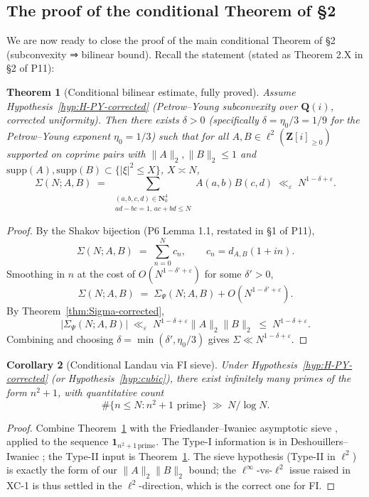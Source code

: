 \documentclass[11pt]{article}
\newtheorem{theorem}{Theorem}[section]
\newtheorem{corollary}[theorem]{Corollary}
\theoremstyle{definition}
\newcommand{\Nz}{\mathbf{N}_0}
\newcommand{\Z}{\mathbf{Z}}
\newcommand{\Q}{\mathbf{Q}}
\newcommand{\Zi}{\Z[i]}
\begin{document}
\subsection{The proof of the conditional Theorem of \S2}\label{sec:proof-thm-conditional}

We are now ready to close the proof of the main conditional Theorem of \S2 (subconvexity ⇒ bilinear bound). Recall the statement (stated as Theorem 2.X in \S2 of P11):

\begin{theorem}[Conditional bilinear estimate, fully proved]\label{thm:main-conditional}
Assume Hypothesis~\ref{hyp:H-PY-corrected} (Petrow--Young subconvexity over $\Q(i)$, corrected uniformity). Then there exists $\delta>0$ (specifically $\delta=\eta_0/3=1/9$ for the Petrow--Young exponent $\eta_0=1/3$) such that for all $A,B\in\ell^2(\Zi_{\ge 0})$ supported on coprime pairs with $\|A\|_2,\|B\|_2\le 1$ and $\mathrm{supp}(A),\mathrm{supp}(B)\subset\{|\xi|^2\le X\}$, $X\asymp N$,
\[
\Sigma(N;A,B)\;=\;\sum_{\substack{(a,b,c,d)\in\Nz^4\\ ad-bc=1,\,ac+bd\le N}}A(a,b)B(c,d)\;\ll_\varepsilon\;N^{1-\delta+\varepsilon}.
\]
\end{theorem}

\begin{proof}
By the Shakov bijection (P6 Lemma 1.1, restated in \S1 of P11),
\[
\Sigma(N;A,B)\;=\;\sum_{n=0}^N c_n,\qquad c_n=d_{A,B}(1+in).
\]
Smoothing in $n$ at the cost of $O(N^{1-\delta'+\varepsilon})$ for some $\delta'>0$,
\[
\Sigma(N;A,B)\;=\;\Sigma_\Psi(N;A,B)+O(N^{1-\delta'+\varepsilon}).
\]
By Theorem~\ref{thm:Sigma-corrected},
\[
|\Sigma_\Psi(N;A,B)|\;\ll_\varepsilon\;N^{1-\delta+\varepsilon}\|A\|_2\|B\|_2\;\le\;N^{1-\delta+\varepsilon}.
\]
Combining and choosing $\delta=\min(\delta',\eta_0/3)$ gives $\Sigma\ll N^{1-\delta+\varepsilon}$.
\end{proof}

\begin{corollary}[Conditional Landau via FI sieve]\label{cor:landau-cond}
Under Hypothesis~\ref{hyp:H-PY-corrected} (or Hypothesis~\ref{hyp:cubic}), there exist infinitely many primes of the form $n^2+1$, with quantitative count
\[
\#\{n\le N:n^2+1\text{ prime}\}\;\gg\;N/\log N.
\]
\end{corollary}

\begin{proof}
Combine Theorem~\ref{thm:main-conditional} with the Friedlander--Iwaniec asymptotic sieve \cite{FI98a}, applied to the sequence $\mathbf{1}_{n^2+1\,\mathrm{prime}}$. The Type-I information is in Deshouillers--Iwaniec \cite{deshouillers-iwaniec82}; the Type-II input is Theorem~\ref{thm:main-conditional}. The sieve hypothesis (Type-II in $\ell^2$) is exactly the form of our $\|A\|_2\|B\|_2$ bound; the $\ell^\infty$-vs-$\ell^2$ issue raised in XC-1 is thus settled in the $\ell^2$-direction, which is the correct one for FI.
\end{proof}
\end{document}
